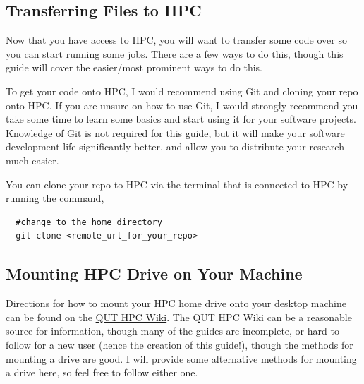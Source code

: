 \subsection{Transferring Files to HPC}
Now that you have access to HPC, you will want to transfer some code over so you can start running some jobs. There are a few ways to do this, though this guide will cover the easier/most prominent ways to do this.
%
%
\par
%
%
To get your code onto HPC, I would recommend using Git and cloning your repo onto HPC. If you are unsure on how to use Git, I would strongly recommend you take some time to learn some basics and start using it for your software projects. Knowledge of Git is not required for this guide, but it will make your software development life significantly better, and allow you to distribute your research much easier.
%
%
\par
%
%
You can clone your repo to HPC via the terminal that is connected to HPC by running the command,
\\
\par
\begin{verbatim}
  #change to the home directory
  git clone <remote_url_for_your_repo>
\end{verbatim}
%
%
\subsection{Mounting HPC Drive on Your Machine}
Directions for how to mount your HPC home drive onto your desktop machine can be found on the \href{https://wiki.qut.edu.au/pages/viewpage.action?pageId=244125273}{QUT HPC Wiki}. The QUT HPC Wiki can be a reasonable source for information, though many of the guides are incomplete, or hard to follow for a new user (hence the creation of this guide!), though the methods for mounting a drive are good. I will provide some alternative methods for mounting a drive here, so feel free to follow either one.
%
%
